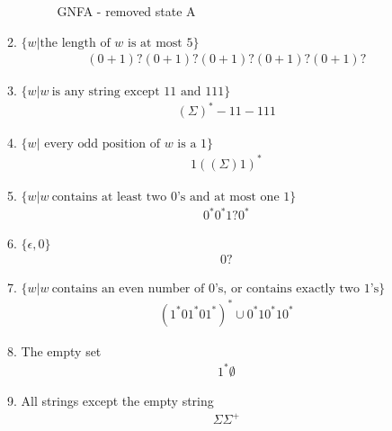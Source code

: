 \begin{enumerate}
\begin{enumerate}
                    \begin{figure}[H]
                        \centering
                        \caption{GNFA - removed state A}
                    \end{figure}
              \item $\{w|\text{the length of }w\text{ is at most }5\}$
                    \begin{align*}
                        (0+1)?(0+1)?(0+1)?(0+1)?(0+1)?
                    \end{align*}
              \item $\{w|w~ \text{is any string except }11\text{ and }111\}$
                    \begin{align*}
                        (\Sigma)^* - 11 - 111
                    \end{align*}
              \item $\{w|\text{ every odd position of }w\text{ is a }1\}$
                    \begin{align*}
                        1((\Sigma)1)^*
                    \end{align*}
              \item $\{w|w~ \text{contains at least two }0\text{'s and at most one }1\}$
                    \begin{align*}
                        0^*0^*1?0^*
                    \end{align*}
              \item $\{\epsilon,0\}$
                    \begin{align*}
                        0?
                    \end{align*}
              \item $\{w|w~ \text{contains an even number of }0\text{'s, or contains exactly two }1\text{'s}\}$
                    \begin{align*}
                        (1^*01^*01^*)^* \cup 0^*10^*10^*
                    \end{align*}
              \item The empty set
                    \begin{align*}
                        1^*\emptyset
                    \end{align*}
              \item All strings except the empty string
                    \begin{align*}
                        \Sigma\Sigma^+
                    \end{align*}
          \end{enumerate}
\end{enumerate}
